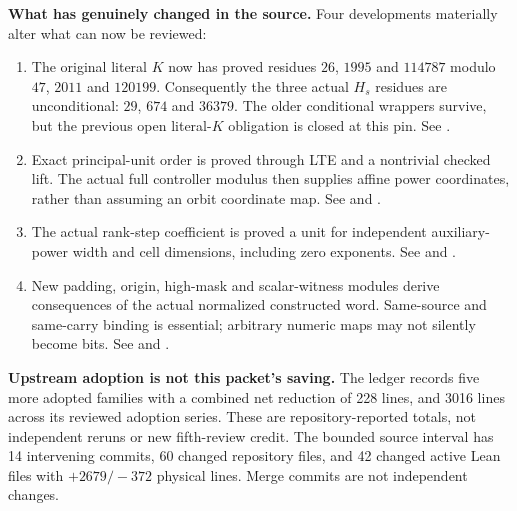 \textbf{What has genuinely changed in the source.} Four developments materially alter what can now be reviewed:
\begin{enumerate}
\item The original literal $K$ now has proved residues $26$, $1995$ and $114787$ modulo $47$, $2011$ and $120199$. Consequently the three actual $H_s$ residues are unconditional: $29$, $674$ and $36379$. The older conditional wrappers survive, but the previous open literal-$K$ obligation is closed at this pin. See .
\item Exact principal-unit order is proved through LTE and a nontrivial checked lift. The actual full controller modulus then supplies affine power coordinates, rather than assuming an orbit coordinate map. See  and .
\item The actual rank-step coefficient is proved a unit for independent auxiliary-power width and cell dimensions, including zero exponents. See  and .
\item New padding, origin, high-mask and scalar-witness modules derive consequences of the actual normalized constructed word. Same-source and same-carry binding is essential; arbitrary numeric maps may not silently become bits. See  and .
\end{enumerate}

\textbf{Upstream adoption is not this packet's saving.} The ledger records five more adopted families with a combined net reduction of 228 lines, and 3016 lines across its reviewed adoption series. These are repository-reported totals, not independent reruns or new fifth-review credit. The bounded source interval has 14 intervening commits, 60 changed repository files, and 42 changed active Lean files with $+2679/-372$ physical lines. Merge commits are not independent changes.
